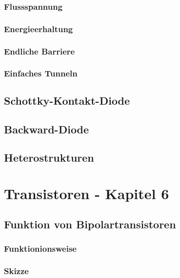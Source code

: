 \documentclass{article}
\begin{document}
    \subsubsection{Flussspannung}
    \subsubsection{Energieerhaltung}
    \subsubsection{Endliche Barriere}
    \subsubsection{Einfaches Tunneln}

\subsection{Schottky-Kontakt-Diode }\label{k5:schottky}

\subsection{Backward-Diode }\label{k5:backward}

\subsection{Heterostrukturen }\label{k5:heterostrukturen}


\section{Transistoren - Kapitel 6}
\subsection{Funktion von Bipolartransistoren }\label{k6:bipolar}
    \subsubsection{Funktionionsweise}
    \subsubsection{Skizze}
\end{document}
